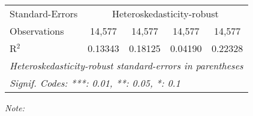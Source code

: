 \begin{table}[htbp!]
\begin{adjustbox}{width = 1\textwidth, max height = 0.95\textheight, center}
\begin{threeparttable}[b]
\begin{tabular}{lcccc}
            \midrule 
            Standard-Errors & \multicolumn{4}{c}{Heteroskedasticity-robust} \\ 
            Observations         & 14,577                          & 14,577                         & 14,577                         & 14,577\\  
            R$^2$                & 0.13343                         & 0.18125                        & 0.04190                        & 0.22328\\  
            \midrule \midrule
            \multicolumn{5}{l}{\emph{Heteroskedasticity-robust standard-errors in parentheses}}\\
            \multicolumn{5}{l}{\emph{Signif. Codes: ***: 0.01, **: 0.05, *: 0.1}}\\
         \end{tabular}
         
         \begin{tablenotes}\item \medskip \textit{Note:}
         \end{tablenotes}
      \end{threeparttable}
   \end{adjustbox}
\end{table}


